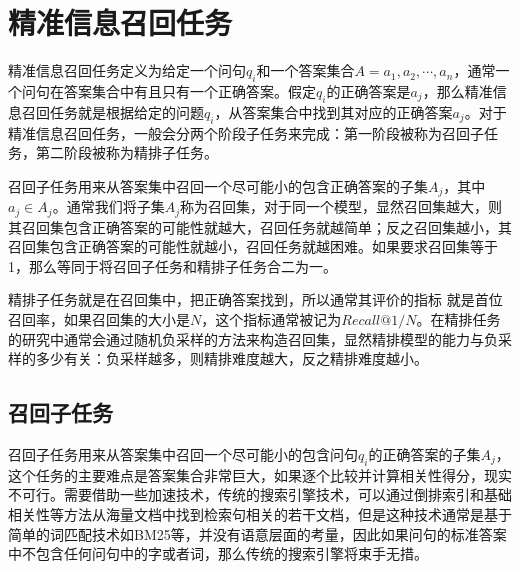 \documentclass[twoside,a4paper,12pt]{book}%
\begin{document}
\section{精准信息召回任务}
精准信息召回任务定义为给定一个问句$q_i$和一个答案集合$A={a_1,a_2,\cdots,a_n}$，通常一个问句在答案集合中有且只有一个正确答案。假定$q_i$的正确答案是$a_j$，那么精准信息召回任务就是根据给定的问题$q_i$，从答案集合中找到其对应的正确答案$a_j$。对于精准信息召回任务，一般会分两个阶段子任务来完成：第一阶段被称为召回子任务，第二阶段被称为精排子任务。

召回子任务用来从答案集中召回一个尽可能小的包含正确答案的子集$A_j$，其中$a_j\in A_j$。通常我们将子集$A_j$称为召回集，对于同一个模型，显然召回集越大，则其召回集包含正确答案的可能性就越大，召回任务就越简单；反之召回集越小，其召回集包含正确答案的可能性就越小，召回任务就越困难。如果要求召回集等于1，那么等同于将召回子任务和精排子任务合二为一。

精排子任务就是在召回集中，把正确答案找到，所以通常其评价的指标
就是首位召回率，如果召回集的大小是$N$，这个指标通常被记为$Recall@1/N$。在精排任务的研究中通常会通过随机负采样的方法来构造召回集，显然精排模型的能力与负采样的多少有关：负采样越多，则精排难度越大，反之精排难度越小。

\subsection{召回子任务}
召回子任务用来从答案集中召回一个尽可能小的包含问句$q_i$的正确答案的子集$A_j$，这个任务的主要难点是答案集合非常巨大，如果逐个比较并计算相关性得分，现实不可行。需要借助一些加速技术，传统的搜索引擎技术，可以通过倒排索引和基础相关性等方法从海量文档中找到检索句相关的若干文档，但是这种技术通常是基于简单的词匹配技术如BM25等，并没有语意层面的考量，因此如果问句的标准答案中不包含任何问句中的字或者词，那么传统的搜索引擎将束手无措。
\end{document}
